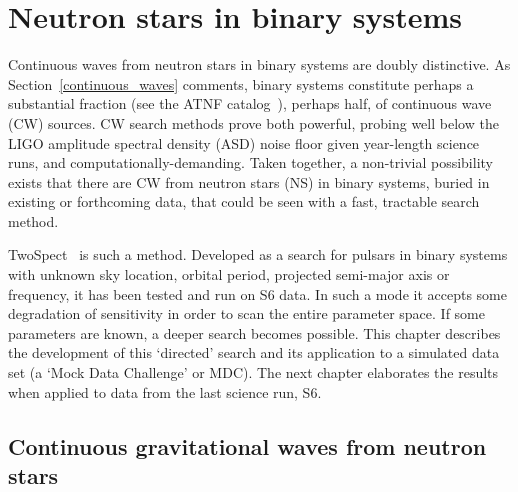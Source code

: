 


        
        \section{Neutron stars in binary systems}
        \label{binary_NS}

Continuous waves from neutron stars in binary systems are doubly distinctive.
As Section~\ref{continuous_waves} comments, binary systems constitute perhaps a substantial fraction (see the ATNF catalog~\cite{ManchesterATNF2005}), perhaps half, of continuous wave (CW) sources.
CW search methods prove both powerful, probing well below the LIGO amplitude spectral density (ASD) noise floor given year-length science runs, and computationally-demanding.
Taken together, a non-trivial possibility exists that there are CW from neutron stars (NS) in binary systems, buried in existing or forthcoming data, that could be seen with a fast, tractable search method.

TwoSpect~\cite{GoetzThesis,GoetzTwoSpectMethods2011} is such a method. 
Developed as a search for pulsars in binary systems with unknown sky location, orbital period, projected semi-major axis or frequency, it has been tested and run on S6 data.
In such a mode it accepts some degradation of sensitivity in order to scan the entire parameter space.
If some parameters are known, a deeper search becomes possible.
This chapter describes the development of this `directed' search and its application to a simulated data set (a `Mock Data Challenge' or MDC).
The next chapter elaborates the results when applied to data from the last science run, S6.


\subsection{Continuous gravitational waves from neutron stars}


